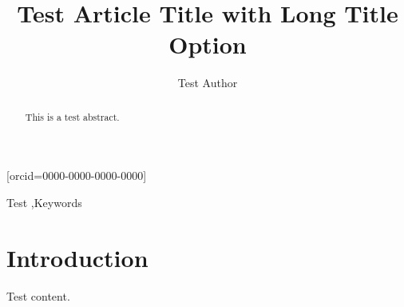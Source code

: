\documentclass[a4paper,fleqn,longmktitle]{cas-dc}
\begin{document}
\let\WriteBookmarks\relax
\def\floatpagepagefraction{1}
\def\textpagefraction{.001}


\title[mode=title]{Test Article Title with Long Title Option}

\author[1]{Test Author}[orcid=0000-0000-0000-0000]

\begin{abstract}
This is a test abstract.
\end{abstract}

\begin{keywords}
Test \sep Keywords
\end{keywords}

\maketitle

\section{Introduction}
Test content.
\end{document}
